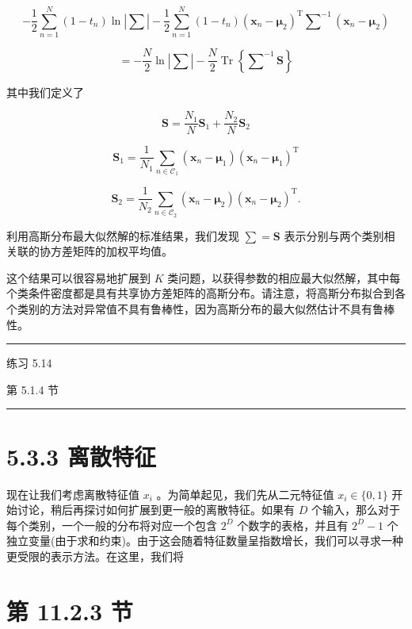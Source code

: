 \documentclass[10pt]{article}
\newcommand{\HRule}{\begin{center}\rule{0.9\linewidth}{0.2mm}\end{center}}
\begin{document}
\[
- \frac{1}{2}\mathop{\sum }\limits_{{n = 1}}^{N}\left( {1 - {t}_{n}}\right) \ln \left| \mathbf{\sum }\right|  - \frac{1}{2}\mathop{\sum }\limits_{{n = 1}}^{N}\left( {1 - {t}_{n}}\right) {\left( {\mathbf{x}}_{n} - {\mathbf{\mu }}_{2}\right) }^{\mathrm{T}}{\mathbf{\sum }}^{-1}\left( {{\mathbf{x}}_{n} - {\mathbf{\mu }}_{2}}\right)
\]

\[
=  - \frac{N}{2}\ln \left| \mathbf{\sum }\right|  - \frac{N}{2}\operatorname{Tr}\left\{  {{\mathbf{\sum }}^{-1}\mathbf{S}}\right\}   \tag{5.60}
\]

其中我们定义了

\[
\mathbf{S} = \frac{{N}_{1}}{N}{\mathbf{S}}_{1} + \frac{{N}_{2}}{N}{\mathbf{S}}_{2} \tag{5.61}
\]

\[
{\mathbf{S}}_{1} = \frac{1}{{N}_{1}}\mathop{\sum }\limits_{{n \in  {\mathcal{C}}_{1}}}\left( {{\mathbf{x}}_{n} - {\mathbf{\mu }}_{1}}\right) {\left( {\mathbf{x}}_{n} - {\mathbf{\mu }}_{1}\right) }^{\mathrm{T}} \tag{5.62}
\]

\[
{\mathbf{S}}_{2} = \frac{1}{{N}_{2}}\mathop{\sum }\limits_{{n \in  {\mathcal{C}}_{2}}}\left( {{\mathbf{x}}_{n} - {\mathbf{\mu }}_{2}}\right) {\left( {\mathbf{x}}_{n} - {\mathbf{\mu }}_{2}\right) }^{\mathrm{T}}. \tag{5.63}
\]

利用高斯分布最大似然解的标准结果，我们发现 \(\mathbf{\sum } = \mathbf{S}\) 表示分别与两个类别相关联的协方差矩阵的加权平均值。

这个结果可以很容易地扩展到 \(K\) 类问题，以获得参数的相应最大似然解，其中每个类条件密度都是具有共享协方差矩阵的高斯分布。请注意，将高斯分布拟合到各个类别的方法对异常值不具有鲁棒性，因为高斯分布的最大似然估计不具有鲁棒性。

\HRule

练习 5.14

第 5.1.4 节

\HRule

\section*{5.3.3 离散特征}

现在让我们考虑离散特征值 \({x}_{i}\) 。为简单起见，我们先从二元特征值 \({x}_{i} \in  \{ 0,1\}\) 开始讨论，稍后再探讨如何扩展到更一般的离散特征。如果有 \(D\) 个输入，那么对于每个类别，一个一般的分布将对应一个包含 \({2}^{D}\) 个数字的表格，并且有 \({2}^{D} - 1\) 个独立变量(由于求和约束)。由于这会随着特征数量呈指数增长，我们可以寻求一种更受限的表示方法。在这里，我们将

\section*{第 11.2.3 节}
\end{document}
